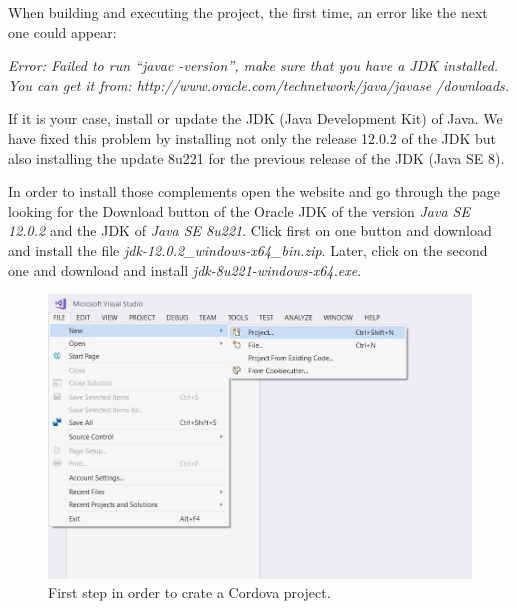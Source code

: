 \begin{IN}
    When building and executing the project, the first time, an error like the next one could appear:\newline
    
    \textit{Error: Failed to run ``javac -version'', make sure that you have a JDK installed.} \newline
    \textit{You can get it from: http://www.oracle.com/technetwork/java/javase /downloads.} \newline 
    
    If it is your case, install or update the JDK (Java Development Kit) of Java. We have fixed this problem by installing not only the release 12.0.2 of the JDK but also installing the update 8u221 for the previous release of the JDK (Java SE 8). \newline
    
    In order to install those complements open the website and go through the page looking for the Download button of the Oracle JDK of the version \textit{Java SE 12.0.2} and the JDK of \textit{Java SE 8u221}. Click first on one button and download and install the file \textit{jdk-12.0.2\_windows-x64\_bin.zip}. Later, click on the second one and download and install \textit{jdk-8u221-windows-x64.exe}.
\end{IN}

\begin{figure}
    \centering
    \includegraphics[width=0.9 \textwidth]{Figures/Cordova1}
    \caption{First step in order to crate a Cordova project.}
    \label{fig:Cordova1}
\end{figure}

